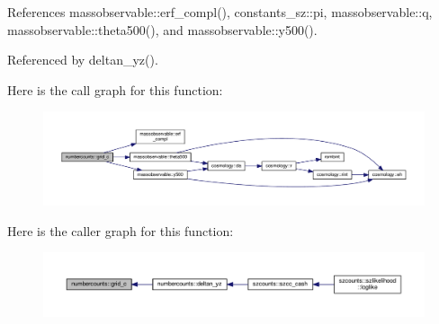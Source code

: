 References massobservable\+::erf\+\_\+compl(), constants\+\_\+sz\+::pi, massobservable\+::q, massobservable\+::theta500(), and massobservable\+::y500().



Referenced by deltan\+\_\+yz().

Here is the call graph for this function\+:
\nopagebreak
\begin{figure}[H]
\begin{center}
\leavevmode
\includegraphics[width=350pt]{namespacenumbercounts_ab87ce14039efd094615930acc710e6b2_cgraph}
\end{center}
\end{figure}
Here is the caller graph for this function\+:
\nopagebreak
\begin{figure}[H]
\begin{center}
\leavevmode
\includegraphics[width=350pt]{namespacenumbercounts_ab87ce14039efd094615930acc710e6b2_icgraph}
\end{center}
\end{figure}
\mbox{\label{namespacenumbercounts_a9147710c647a39e457fa04786c7c295d}} 
